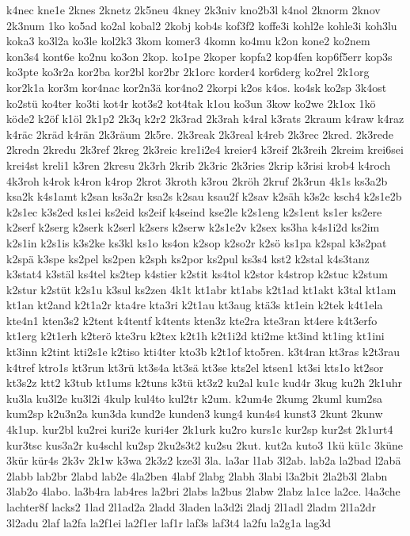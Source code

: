 {k4nec
kne1e
2knes
2knetz
2k5neu
4kney
2k3niv
kno2b3l
k4nol
2knorm
2knov
2k3num
1ko
ko5ad
ko2al
kobal2
2kobj
kob4s
kof3f2
koffe3i
kohl2e
kohle3i
koh3lu
koka3
ko3l2a
ko3le
kol2k3
3kom
komer3
4komn
ko4mu
k2on
kone2
ko2nem
kon3s4
kont6e
ko2nu
ko3on
2kop.
ko1pe
2koper
kopfa2
kop4fen
kop6f5err
kop3s
ko3pte
ko3r2a
kor2ba
kor2bl
kor2br
2k1orc
korder4
kor6derg
ko2rel
2k1org
kor2k1a
kor3m
kor4nac
kor2n3ä
kor4no2
2korpi
k2os
k4os.
ko4sk
ko2sp
3k4ost
ko2stü
ko4ter
ko3ti
kot4r
kot3s2
kot4tak
k1ou
ko3un
3kow
ko2we
2k1ox
1kö
köde2
k2öf
k1öl
2k1p2
2k3q
k2r2
2k3rad
2k3rah
k4ral
k3rats
2kraum
k4raw
k4raz
k4räc
2kräd
k4rän
2k3räum
2k5re.
2k3reak
2k3real
k4reb
2k3rec
2kred.
2k3rede
2kredn
2kredu
2k3ref
2kreg
2k3reic
kre1i2e4
kreier4
k3reif
2k3reih
2kreim
krei6sei
krei4st
kreli1
k3ren
2kresu
2k3rh
2krib
2k3ric
2k3ries
2krip
k3risi
krob4
k4roch
4k3roh
k4rok
k4ron
k4rop
2krot
3kroth
k3rou
2kröh
2kruf
2k3run
4k1s
ks3a2b
ksa2k
k4s1amt
k2san
ks3a2r
ksa2s
k2sau
ksau2f
k2sav
k2säh
k3s2c
ksch4
k2s1e2b
k2s1ec
k3s2ed
ks1ei
ks2eid
ks2eif
k4seind
kse2le
k2s1eng
k2s1ent
ks1er
ks2ere
k2serf
k2serg
k2serk
k2serl
k2sers
k2serw
k2s1e2v
k2sex
ks3ha
k4s1i2d
ks2im
k2s1in
k2s1is
k3s2ke
ks3kl
ks1o
ks4on
k2sop
k2so2r
k2sö
ks1pa
k2spal
k3s2pat
k2spä
k3spe
ks2pel
ks2pen
k2sph
ks2por
ks2pul
ks3s4
kst2
k2stal
k4s3tanz
k3stat4
k3stäl
ks4tel
ks2tep
k4stier
k2stit
ks4tol
k2stor
k4strop
k2stuc
k2stum
k2stur
k2stüt
k2s1u
k3sul
ks2zen
4k1t
kt1abr
kt1abs
k2t1ad
kt1akt
k3tal
kt1am
kt1an
kt2and
k2t1a2r
kta4re
kta3ri
k2t1au
kt3aug
ktä3s
kt1ein
k2tek
k4t1ela
kte4n1
kten3s2
k2tent
k4tentf
k4tents
kten3z
kte2ra
kte3ran
kt4ere
k4t3erfo
kt1erg
k2t1erh
k2terö
kte3ru
k2tex
k2t1h
k2t1i2d
kti2me
kt3ind
kt1ing
kt1ini
kt3inn
k2tint
kti2s1e
k2tiso
kti4ter
kto3b
k2t1of
kto5ren.
k3t4ran
kt3ras
k2t3rau
k4tref
ktro1s
kt3run
kt3rü
kt3s4a
kt3sä
kt3se
kts2el
ktsen1
kt3si
kts1o
kt2sor
kt3s2z
ktt2
k3tub
kt1ums
k2tuns
k3tü
kt3z2
ku2al
ku1c
kud4r
3kug
ku2h
2k1uhr
ku3la
ku3l2e
ku3l2i
4kulp
kul4to
kul2tr
k2um.
k2um4e
2kumg
2kuml
kum2sa
kum2sp
k2u3n2a
kun3da
kund2e
kunden3
kung4
kun4s4
kunst3
2kunt
2kunw
4k1up.
kur2bl
ku2rei
kuri2e
kuri4er
2k1urk
ku2ro
kurs1c
kur2sp
kur2st
2k1urt4
kur3tsc
kus3a2r
ku4schl
ku2sp
2ku2s3t2
ku2su
2kut.
kut2a
kuto3
1kü
kü1c
3küne
3kür
kür4s
2k3v
2k1w
k3wa
2k3z2
kze3l
3la.
la3ar
l1ab
3l2ab.
lab2a
la2bad
l2abä
2labb
lab2br
2labd
lab2e
4la2ben
4labf
2labg
2labh
3labi
l3a2bit
2la2b3l
2labn
3lab2o
4labo.
la3b4ra
lab4res
la2bri
2labs
la2bus
2labw
2labz
la1ce
la2ce.
l4a3che
lachter8f
lacks2
1lad
2l1ad2a
2ladd
3laden
la3d2i
2ladj
2l1adl
2ladm
2l1a2dr
3l2adu
2laf
la2fa
la2f1ei
la2f1er
laf1r
laf3s
laf3t4
la2fu
la2g1a
lag3d
}
